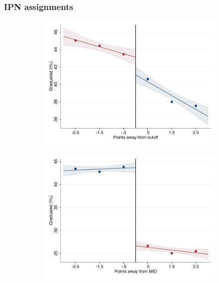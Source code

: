 \documentclass[oneside,11pt]{article}
\begin{document}
\subsubsection{IPN assignments}

\begin{figure}[H]

    \caption{RD plots for outcome variables across those assigned to IPN high-school, and those who are not\label{fig:ITT_rd_plot_IPN_1}}
    \begin{center}
    
    \begin{subfigure}{0.475\textwidth}
        \centering
        \includegraphics[width=\textwidth]{04_Figures/rd_plot_tau_ENLACE_ANY_IPN3.pdf}
    \end{subfigure}
    \begin{subfigure}{0.475\textwidth}
        \centering
        \includegraphics[width=\textwidth]{04_Figures/rd_plot_mid_ENLACE_ANY_IPN3.pdf}
    \end{subfigure}


\end{center}
\end{figure}
\end{document}
